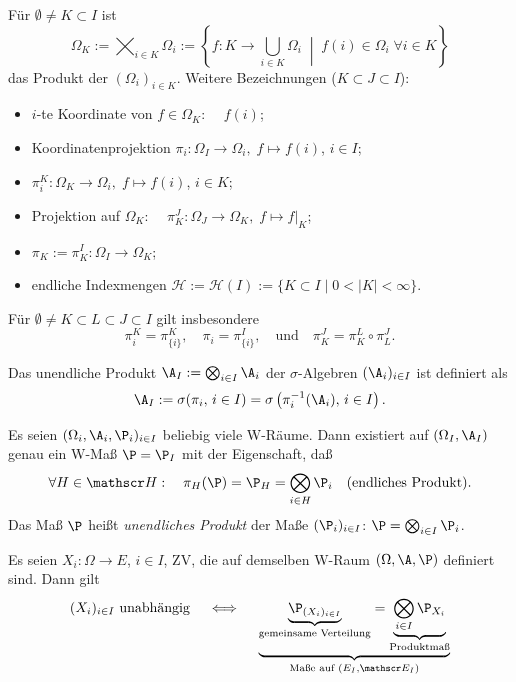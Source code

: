 \documentclass[11pt, a4paper]{article}
\begin{document}
\begin{definition}
    Für $\emptyset \ne K \subset I$ ist
    $$\Omega_K := \bigtimes_{i \in K} \Omega_i := \left\{ f: K \to \bigcup_{i\in K} \Omega_i \; \middle| \; f(i) \in \Omega_i \; \forall i \in K \right\}$$
    das Produkt der $(\Omega_i)_{i \in K}$. Weitere Bezeichnungen ($K \subset J \subset I$):
    \begin{itemize}[label=--]
        \item $i$-te Koordinate von $f \in \Omega_K$: $\quad f(i)$;
        \item Koordinatenprojektion $\pi_i: \Omega_I \to \Omega_i, \; f \mapsto f(i)$, $i \in I$;
        \item $\pi_i^K: \Omega_K \to \Omega_i, \; f \mapsto f(i)$, $i \in K$;
        \item Projektion auf $\Omega_K$: $\quad \pi_K^J: \Omega_J \to \Omega_K, \; f \mapsto f|_K$;
        \item $\pi_K := \pi_K^I: \Omega_I \to \Omega_K$;
        \item endliche Indexmengen $\mathscr{H} := \mathscr{H}(I) := \{K \subset I \mid 0 < |K| < \infty\}$.
    \end{itemize}
    Für $\emptyset \ne K \subset L \subset J \subset I$ gilt insbesondere
    $$\pi_i^K = \pi_{\{i\}}^K, \quad \pi_i = \pi_{\{i\}}^I, \quad \text{und} \quad \pi_K^J = \pi_K^L \circ \pi_L^J.$$
\end{definition}
\begin{definition}
    Das unendliche Produkt $\A_I := \bigotimes_{i \in I} \A_i$ der $\sigma$-Algebren $(\A_i)_{i\in I}$ ist definiert als
    $$\A_I := \sigma(\pi_i, \, i \in I) = \sigma\left(\pi_i^{-1}(\A_i), \, i \in I\right).$$
\end{definition}

\begin{theorem}[Kolmogorov]\Theorem
    Es seien $(\Omega_i, \A_i, \P_i)_{i\in I}$ beliebig viele W-Räume. Dann existiert auf $(\Omega_I, \A_I)$ genau ein W-Maß $\P = \P_I$ mit der Eigenschaft, daß
    $$\forall H \in \mathscr H: \quad \pi_H(\P) = \P_H = \bigotimes_{i\in H} \P_i \quad \text{(endliches Produkt)}.$$
    Das Maß $\P$ heißt \emph{unendliches Produkt} der Maße $(\P_i)_{i\in I}$: $\P = \bigotimes_{i\in I} \P_i$.
\end{theorem}

\begin{corollary}
    Es seien $X_i: \Omega \to E$, $i \in I$, ZV, die auf demselben W-Raum $(\Omega, \A, \P)$ definiert sind. Dann gilt
    $$(X_i)_{i\in I} \text{ unabhängig} \quad \iff \quad \underbrace{\underbrace{\P_{(X_i)_{i\in I}}}_{\text{gemeinsame Verteilung}} = \underbrace{\bigotimes_{i\in I} \P_{X_i}}_{\text{Produktmaß}}}_{\text{Maße auf } (E_I, \mathscr E_I)}$$
\end{corollary}
\end{document}
